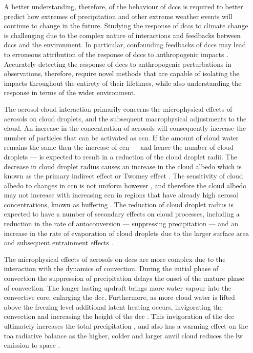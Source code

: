 A better understanding, therefore, of the behaviour of \acrshort{dcc}s is required to better predict how extremes of precipitation and other extreme weather events will continue to change in the future.
Studying the response of \acrshort{dcc}s to climate change is challenging due to the complex nature of interactions and feedbacks between \acrshort{dcc}s and the environment.
In particular, confounding feedbacks of \acrshort{dcc}s may lead to erroneous attribution of the response of \acrshort{dcc}s to anthropogenic impacts \citep{varble_erroneous_2018}.
Accurately detecting the response of \acrshort{dcc}s to anthropogenic perturbations in observations, therefore, require novel methods that are capable of isolating the impacts throughout the entirety of their lifetimes, while also understanding the response in terms of the wider environment.


The aerosol-cloud interaction primarily concerns the microphysical effects of aerosols on cloud droplets, and the subsequent macrophysical adjustments to the cloud.
An increase in the concentration of aerosols will consequently increase the number of particles that can be activated as \acrshort{ccn}.
If the amount of cloud water remains the same then the increase of \acrshort{ccn} --- and hence the number of cloud droplets --- is expected to result in a reduction of the cloud droplet radii.
The decrease in cloud droplet radius causes an increase in the cloud albedo which is known as the primary indirect effect or Twomey effect \citep{twomey_pollution_1974}.
The sensitivity of cloud albedo to changes in \acrshort{ccn} is not uniform however \citep{twomey_aerosols_1991}, and therefore the cloud albedo may not increase with increasing \acrshort{ccn} in regions that have already high aerosol concentrations, known as buffering \citep{stevens_untangling_2009}.
The reduction of cloud droplet radius is expected to have a number of secondary effects on cloud processes, including a reduction in the rate of autoconversion --- suppressing precipitation \citep{albrecht_aerosols_1989} --- and an increase in the rate of evaporation of cloud droplets due to the larger surface area and subsequent entrainment effects \citep{ackerman_impact_2004}.

The microphysical effects of aerosols on \acrshort{dcc}s are more complex due to the interaction with the dynamics of convection.
During the initial phase of convection the suppression of precipitation delays the onset of the mature phase of convection.
The longer lasting updraft brings more water vapour into the convective core, enlarging the \acrshort{dcc}.
Furthermore, as more cloud water is lifted above the freezing level additional latent heating occurs, invigorating the convection and increasing the height of the \acrshort{dcc} \citep{khain2005aerosol}.
This invigoration of the \acrshort{dcc} ultimately increases the total precipitation \citep{koren_aerosol_2005}, and also has a warming effect on the \acrshort{toa}  radiative balance as the higher, colder and larger anvil cloud reduces the \acrshort{lw}  emission to space \citep{rosenfeld_flood_2008,fan_microphysical_2013}.

